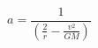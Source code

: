 \begin{equation*}
a = \frac{1}{\left(\frac{2}{r} - \frac{v^{2}}{GM}\right)} \tag{4.32}
\end{equation*}
